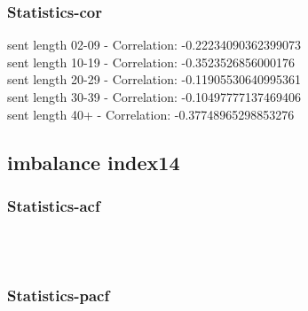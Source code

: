 \documentclass{article}%
\begin{document}
%
\newpage%
\subsubsection{Statistics{-}cor}%
\label{ssubsec:Statistics{-}cor}%
\noindent%
sent length 02-09 - Correlation: -0.22234090362399073\\%
sent length 10-19 - Correlation: -0.3523526856000176\\%
sent length 20-29 - Correlation: -0.11905530640995361\\%
sent length 30-39 - Correlation: -0.10497777137469406\\%
sent length 40+ - Correlation: -0.37748965298853276\\

%
\newpage

%
\subsection{imbalance index14}%
\label{subsec:imbalanceindex14}%
\subsubsection{Statistics{-}acf}%
\label{ssubsec:Statistics{-}acf}%


\begin{figure}[ht]%
\centering%
\setlength{\abovecaptionskip}{-35pt}%
%
%
\\%
%
%
\\%
%
\end{figure}

%
\newpage%
\subsubsection{Statistics{-}pacf}%
\label{ssubsec:Statistics{-}pacf}%
\end{document}
